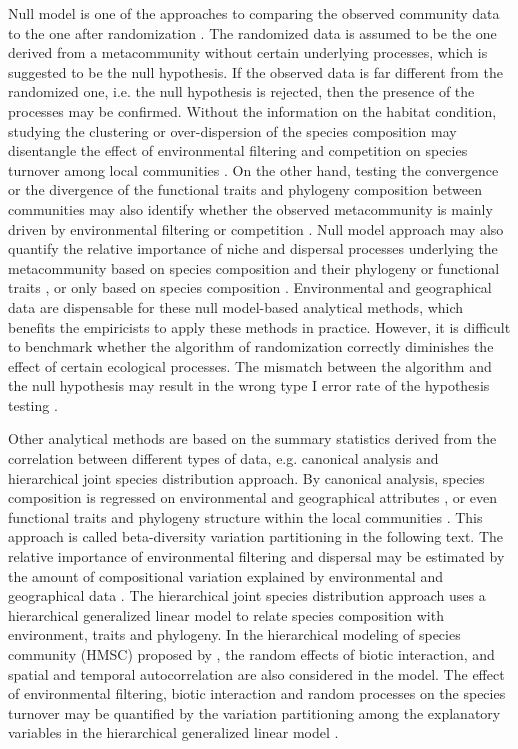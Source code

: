 	Null model is one of the approaches to comparing the observed community data to the one after randomization \citep{gotelli2006null, gotelli2012statistical}. The randomized data is assumed to be the one derived from a metacommunity without certain underlying processes, which is suggested to be the null hypothesis. If the observed data is far different from the randomized one, i.e. the null hypothesis is rejected, then the presence of the processes may be confirmed. Without the information on the habitat condition, studying the clustering or over-dispersion of the species composition may disentangle the effect of environmental filtering and competition on species turnover among local communities \citep{diamond1975island, connor1979assembly, chase2011disentangling}. On the other hand, testing the convergence or the divergence of the functional traits and phylogeny composition between communities may also identify whether the observed metacommunity is mainly driven by environmental filtering or competition \citep{mayfield2010opposing}. Null model approach may also quantify the relative importance of niche and dispersal processes underlying the metacommunity based on species composition and their phylogeny or functional traits \citep{stegen2013quantifying, ford2020functional}, or only based on species composition \citep{gibert2019per, vilmi2021dispersal}. Environmental and geographical data are dispensable for these null model-based analytical methods, which benefits the empiricists to apply these methods in practice. However, it is difficult to benchmark whether the algorithm of randomization correctly diminishes the effect of certain ecological processes. The mismatch between the algorithm and the null hypothesis may result in the wrong type I error rate of the hypothesis testing \citep{molina2020difficulties}.   
	
	Other analytical methods are based on the summary statistics derived from the correlation between different types of data, e.g. canonical analysis and hierarchical joint species distribution approach. By canonical analysis, species composition is regressed on environmental and geographical attributes \citep{borcard1992partialling}, or even functional traits and phylogeny structure within the local communities \citep{sirbu2021variation}. This approach is called beta-diversity variation partitioning in the following text. The relative importance of environmental filtering and dispersal may be estimated by the amount of compositional variation explained by environmental and geographical data \citep{cottenie2005integrating}. The hierarchical joint species distribution approach uses a hierarchical generalized linear model to relate species composition with environment, traits and phylogeny. In the hierarchical modeling of species community (HMSC) proposed by \citet{ovaskainen2017make}, the random effects of biotic interaction, and spatial and temporal autocorrelation are also considered in the model. The effect of environmental filtering, biotic interaction and random processes on the species turnover may be quantified by the variation partitioning among the explanatory variables in the hierarchical generalized linear model \citep{ovaskainen2017make}.
	
